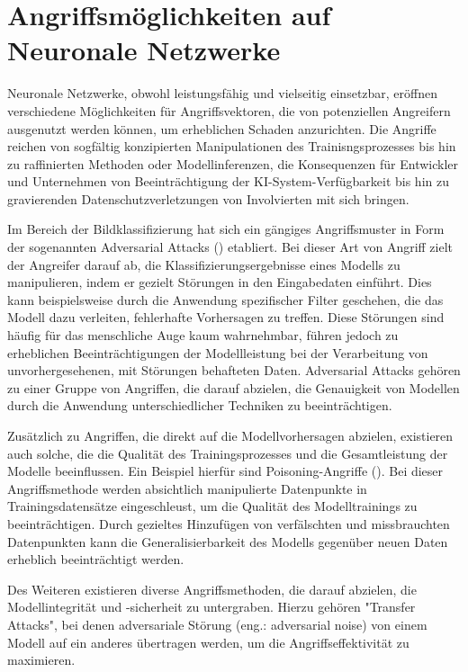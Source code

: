 \section{Angriffsmöglichkeiten auf Neuronale Netzwerke} \label{chpt:Stand_der_Technik_Angriffe}
Neuronale Netzwerke, obwohl leistungsfähig und vielseitig einsetzbar, eröffnen verschiedene Möglichkeiten für Angriffsvektoren, die von potenziellen Angreifern ausgenutzt werden können, um erheblichen Schaden anzurichten. Die Angriffe reichen von sogfältig konzipierten Manipulationen des Trainisngsprozesses bis hin zu raffinierten Methoden oder Modellinferenzen, die Konsequenzen für Entwickler und Unternehmen von Beeinträchtigung der KI-System-Verfügbarkeit bis hin zu gravierenden Datenschutzverletzungen von Involvierten mit sich bringen.

Im Bereich der Bildklassifizierung hat sich ein gängiges Angriffsmuster in Form der sogenannten \glqq Adversarial Attacks\grqq{} (\cite{machado_adversarial_2023}) etabliert. Bei dieser Art von Angriff zielt der Angreifer darauf ab, die Klassifizierungsergebnisse eines Modells zu manipulieren, indem er gezielt Störungen in den Eingabedaten einführt. Dies kann beispielsweise durch die Anwendung spezifischer Filter geschehen, die das Modell dazu verleiten, fehlerhafte Vorhersagen zu treffen. Diese Störungen sind häufig für das menschliche Auge kaum wahrnehmbar, führen jedoch zu erheblichen Beeinträchtigungen der Modellleistung bei der Verarbeitung von unvorhergesehenen, mit Störungen behafteten Daten. Adversarial Attacks gehören zu einer Gruppe von Angriffen, die darauf abzielen, die Genauigkeit von Modellen durch die Anwendung unterschiedlicher Techniken zu beeinträchtigen.

Zusätzlich zu Angriffen, die direkt auf die Modellvorhersagen abzielen, existieren auch solche, die die Qualität des Trainingsprozesses und die Gesamtleistung der Modelle beeinflussen. Ein Beispiel hierfür sind \glqq Poisoning-Angriffe\grqq{} (\cite{ramirez_poisoning_2022}). Bei dieser Angriffsmethode werden absichtlich manipulierte Datenpunkte in Trainingsdatensätze eingeschleust, um die Qualität des Modelltrainings zu beeinträchtigen. Durch gezieltes Hinzufügen von verfälschten und missbrauchten Datenpunkten kann die Generalisierbarkeit des Modells gegenüber neuen Daten erheblich beeinträchtigt werden.

Des Weiteren existieren diverse Angriffsmethoden, die darauf abzielen, die Modellintegrität und -sicherheit zu untergraben. Hierzu gehören "Transfer Attacks", bei denen adversariale Störung (eng.: adversarial noise) von einem Modell auf ein anderes übertragen werden, um die Angriffseffektivität zu maximieren.

